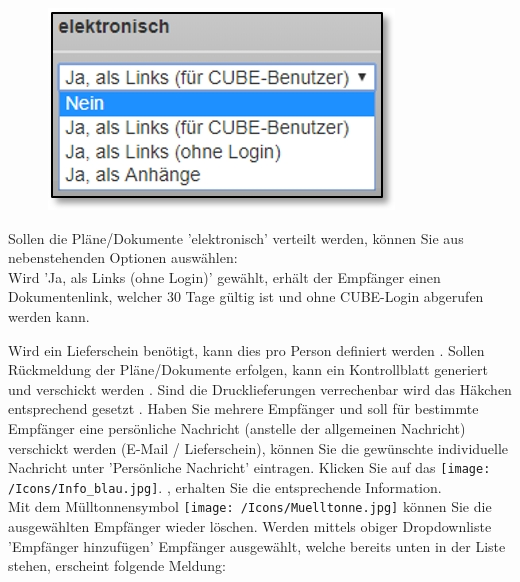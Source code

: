 \begin{figure}   %
  \vspace{-30pt}      %
  \begin{center}
    \includegraphics[width=1\linewidth]{../chapters/11_Dokumentenablage/pictures/repro_elektronisch.jpg}
  \end{center}
  \vspace{-20pt}
  \vspace{-10pt}
\end{figure}
Sollen die Pläne/Dokumente 'elektronisch'  verteilt werden, können Sie aus nebenstehenden Optionen auswählen:\\
Wird 'Ja, als Links (ohne Login)' gewählt, erhält der Empfänger einen Dokumentenlink, welcher 30 Tage gültig ist und ohne CUBE-Login abgerufen werden kann.

\vspace{.5cm} 


Wird ein Lieferschein benötigt, kann dies pro Person definiert werden . Sollen Rückmeldung der Pläne/Dokumente erfolgen, kann ein Kontrollblatt generiert und verschickt werden . Sind die Drucklieferungen verrechenbar wird das Häkchen entsprechend gesetzt . Haben Sie mehrere Empfänger und soll für bestimmte Empfänger eine persönliche Nachricht (anstelle der allgemeinen Nachricht) verschickt werden (E-Mail / Lieferschein), können Sie die gewünschte individuelle Nachricht unter 'Persönliche Nachricht'  eintragen. Klicken Sie auf das \texttt{[image: /Icons/Info\_blau.jpg]}. , erhalten Sie die entsprechende Information.\\
Mit dem Mülltonnensymbol \texttt{[image: /Icons/Muelltonne.jpg]}  können Sie die ausgewählten Empfänger wieder löschen. Werden mittels obiger Dropdownliste 'Empfänger hinzufügen'  Empfänger ausgewählt, welche bereits unten in der Liste stehen, erscheint folgende Meldung:

